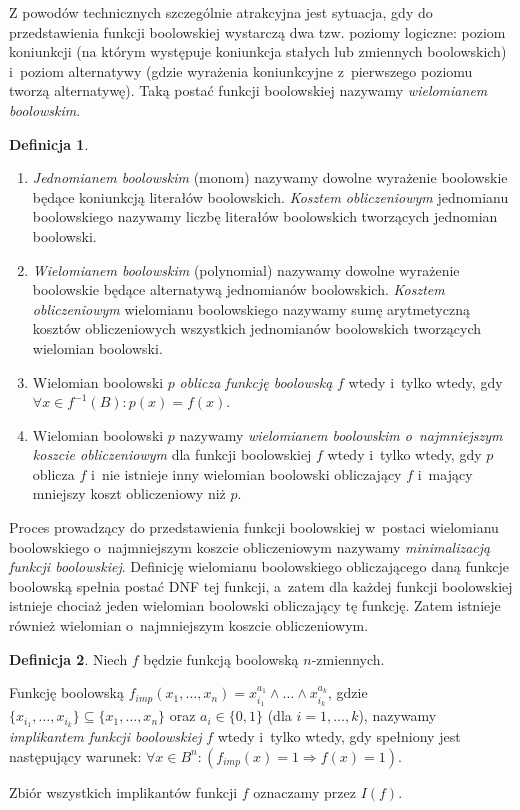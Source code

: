 \documentclass[a4paper,11pt,twoside]{article}
\theoremstyle{definition}
\newtheorem{df}{Definicja}
\begin{document}
Z powodów technicznych szczególnie atrakcyjna jest sytuacja, gdy do przedstawienia funkcji boo\-lowskiej wystarczą dwa tzw. poziomy logiczne: poziom koniunkcji (na którym występuje koniunkcja stałych lub zmiennych boolowskich) i~poziom alternatywy (gdzie wyrażenia koniunkcyjne z~pierwszego poziomu tworzą alternatywę). Taką postać funkcji boolowskiej nazywamy {\em wielomianem boolowskim}.
\begin{df}
\begin{enumerate}

Niech $f$ będzie funkcją boolowską $n$-zmiennych.

\item{\em Jednomianem boolowskim} (monom) nazywamy dowolne wyrażenie boolowskie będące koniunkcją literałów boolowskich. {\em Kosztem obliczeniowym} jednomianu boolowskiego nazywamy liczbę literałów boolowskich tworzących jednomian boolowski.

\item{\em Wielomianem boolowskim} (polynomial) nazywamy dowolne wyrażenie boolowskie będące alternatywą jednomianów boolowskich. {\em Kosztem obliczeniowym} wielomianu boolowskiego nazywamy sumę arytmetyczną kosztów obliczeniowych wszystkich jednomianów boolowskich tworzących wielomian boolowski.

\item Wielomian boolowski $p$ {\em oblicza funkcję boolowską} $f$ wtedy i~tylko wtedy, gdy\\ $\forall x \in f^{-1}(B)\colon p(x) = f(x)$.

\item Wielomian boolowski $p$ nazywamy {\em wielomianem boolowskim o~najmniejszym koszcie obliczeniowym} dla funkcji boolowskiej $f$ wtedy i~tylko wtedy, gdy $p$ oblicza $f$ i~nie istnieje inny wielomian boolowski obliczający $f$ i~mający mniejszy koszt obliczeniowy niż $p$.
\end{enumerate}
\end{df}
Proces prowadzący do przedstawienia funkcji boolowskiej w~postaci wielomianu boolowskiego o~najmniejszym koszcie obliczeniowym nazywamy {\em minimalizacją funkcji boolowskiej}. Definicję wielomianu boolowskiego obliczającego daną funkcje boolowską spełnia postać DNF tej funkcji, a~zatem dla każdej funkcji boolowskiej istnieje chociaż jeden wielomian boolowski obliczający tę funkcję. Zatem istnieje również wielomian o~najmniejszym koszcie obliczeniowym. 
\begin{df}
Niech $f$ będzie funkcją boolowską $n$-zmiennych. 

Funkcję boolowską $f_{imp}(x_1,\dots,x_n) = x_{i_1}^{a_1} \wedge \dots \wedge x_{i_k}^{a_k}$, gdzie $\{x_{i_1},\dots,x_{i_k}\} \subseteq \{x_{1},\dots,x_{n}\}$ oraz $a_i \in \{0,1\}$ (dla $i=1,\dots,k$), nazywamy {\em implikantem funkcji boolowskiej} $f$ wtedy i~tylko wtedy, gdy spełniony jest następujący warunek: $\forall x \in B^n \colon (f_{imp}(x) = 1 \Rightarrow f(x) = 1)$.

Zbiór wszystkich implikantów funkcji $f$ oznaczamy przez $I(f)$.
\end{df}
\end{document}
